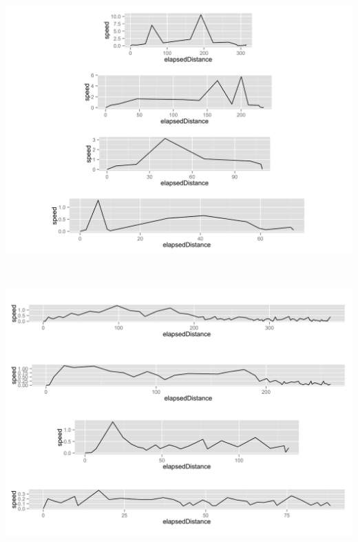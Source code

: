 \begin{minipage}{\linewidth}
\begin{minipage}{.475\linewidth}
	\centering
	\includegraphics[width=\linewidth]{images/plots/plot_speed_individual_140}
	\label{fig:speed_distance_testperson_140}
	\end{minipage}
	\begin{minipage}[b]{0.05\linewidth}
	~
	\end{minipage}
	\begin{minipage}{.475\linewidth}
		\centering
		\includegraphics[width=\linewidth]{images/plots/plot_speed_individual_248}
		\label{fig:speed_distance_testperson_248}
	\end{minipage}
\end{minipage}

